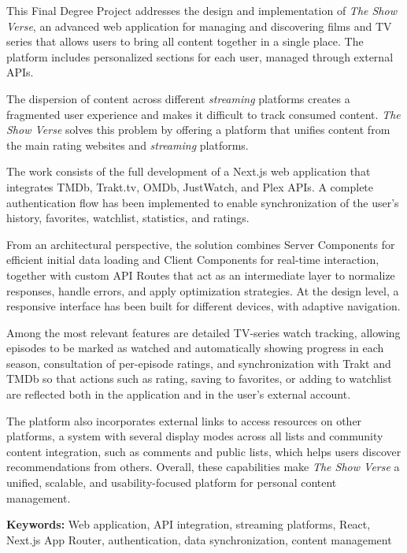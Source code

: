 This Final Degree Project addresses the design and implementation of \textit{The Show Verse}, an advanced web application for managing and discovering films and TV series that allows users to bring all content together in a single place. The platform includes personalized sections for each user, managed through external APIs.

The dispersion of content across different \textit{streaming} platforms creates a fragmented user experience and makes it difficult to track consumed content. \textit{The Show Verse} solves this problem by offering a platform that unifies content from the main rating websites and \textit{streaming} platforms.

The work consists of the full development of a Next.js web application that integrates TMDb, Trakt.tv, OMDb, JustWatch, and Plex APIs. A complete authentication flow has been implemented to enable synchronization of the user's history, favorites, watchlist, statistics, and ratings.

From an architectural perspective, the solution combines Server Components for efficient initial data loading and Client Components for real-time interaction, together with custom API Routes that act as an intermediate layer to normalize responses, handle errors, and apply optimization strategies. At the design level, a responsive interface has been built for different devices, with adaptive navigation.

Among the most relevant features are detailed TV-series watch tracking, allowing episodes to be marked as watched and automatically showing progress in each season, consultation of per-episode ratings, and synchronization with Trakt and TMDb so that actions such as rating, saving to favorites, or adding to watchlist are reflected both in the application and in the user's external account.

The platform also incorporates external links to access resources on other platforms, a system with several display modes across all lists and community content integration, such as comments and public lists, which helps users discover recommendations from others. Overall, these capabilities make \textit{The Show Verse} a unified, scalable, and usability-focused platform for personal content management.

\vspace{0.5cm}
\noindent\textbf{Keywords:} Web application, API integration, streaming platforms, React, Next.js App Router, authentication, data synchronization, content management